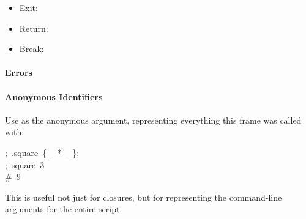 \documentclass[preprint]{{sigplanconf}}
\begin{document}
\begin{itemize}[noitemsep,topsep=\mdcompacttopsep]%

\item{}Exit: %

\item{}Return: %

\item{}Break: %
\end{itemize}%

\paragraph{Errors}\label{sec-errors}%

\noindent{}%

\paragraph{Anonymous Identifiers}\label{sec-anonymous-identifiers}%

\noindent{}Use \mdcode{\_} as the anonymous argument, representing everything this frame
was called with:%
\begin{mdpre}%
\noindent;~.square~\{\_~*~\_\};\\
;~square~3\\
{\#~9}%
\end{mdpre}\noindent{}This is useful not just for closures, but for representing the command-line
arguments for the entire script.
\end{document}
